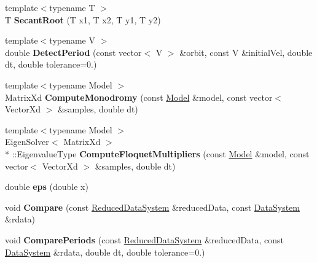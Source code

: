 \begin{DoxyCompactItemize}
\item 
\hypertarget{namespace_d_r_d_s_p_ae431e14d8b53858737b1183527375fe1}{{\footnotesize template$<$typename T $>$ }\\T {\bfseries Secant\-Root} (T x1, T x2, T y1, T y2)}\label{namespace_d_r_d_s_p_ae431e14d8b53858737b1183527375fe1}

\item 
\hypertarget{namespace_d_r_d_s_p_aeefcd5a2eea25ee6c645c559f6fa4c76}{{\footnotesize template$<$typename V $>$ }\\double {\bfseries Detect\-Period} (const vector$<$ V $>$ \&orbit, const V \&initial\-Vel, double dt, double tolerance=0.)}\label{namespace_d_r_d_s_p_aeefcd5a2eea25ee6c645c559f6fa4c76}

\item 
\hypertarget{namespace_d_r_d_s_p_a3dbe23e49cdb6cfa8507b19682cf3df2}{{\footnotesize template$<$typename Model $>$ }\\Matrix\-Xd {\bfseries Compute\-Monodromy} (const \hyperlink{struct_d_r_d_s_p_1_1_model}{Model} \&model, const vector$<$ Vector\-Xd $>$ \&samples, double dt)}\label{namespace_d_r_d_s_p_a3dbe23e49cdb6cfa8507b19682cf3df2}

\item 
\hypertarget{namespace_d_r_d_s_p_a61ce84478bd3ef4cb21b85daf3c72349}{{\footnotesize template$<$typename Model $>$ }\\Eigen\-Solver$<$ Matrix\-Xd $>$\\*
\-::Eigenvalue\-Type {\bfseries Compute\-Floquet\-Multipliers} (const \hyperlink{struct_d_r_d_s_p_1_1_model}{Model} \&model, const vector$<$ Vector\-Xd $>$ \&samples, double dt)}\label{namespace_d_r_d_s_p_a61ce84478bd3ef4cb21b85daf3c72349}

\item 
\hypertarget{namespace_d_r_d_s_p_a3b30bed0190ad5f81bf7d2f7c53eaf7c}{double {\bfseries eps} (double x)}\label{namespace_d_r_d_s_p_a3b30bed0190ad5f81bf7d2f7c53eaf7c}

\item 
\hypertarget{namespace_d_r_d_s_p_aa45917cc76977abca1d6febb472ef839}{void {\bfseries Compare} (const \hyperlink{struct_d_r_d_s_p_1_1_reduced_data_system}{Reduced\-Data\-System} \&reduced\-Data, const \hyperlink{struct_d_r_d_s_p_1_1_data_system}{Data\-System} \&rdata)}\label{namespace_d_r_d_s_p_aa45917cc76977abca1d6febb472ef839}

\item 
\hypertarget{namespace_d_r_d_s_p_a066149977b4932776924fb7fa4e2eb89}{void {\bfseries Compare\-Periods} (const \hyperlink{struct_d_r_d_s_p_1_1_reduced_data_system}{Reduced\-Data\-System} \&reduced\-Data, const \hyperlink{struct_d_r_d_s_p_1_1_data_system}{Data\-System} \&rdata, double dt, double tolerance=0.)}\label{namespace_d_r_d_s_p_a066149977b4932776924fb7fa4e2eb89}


\end{DoxyCompactItemize}
